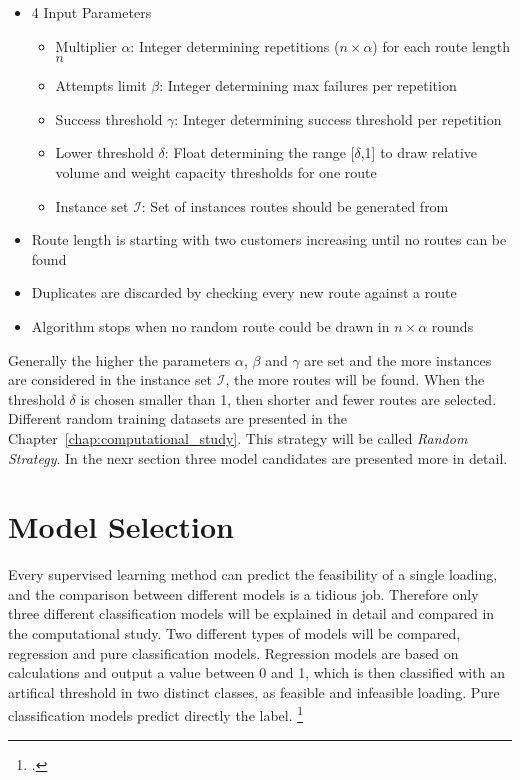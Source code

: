 \begin{itemize}
    \item 4 Input Parameters
          \begin{itemize}
              \item Multiplier $\alpha$: Integer determining repetitions ($n\times\alpha$) for each route length $n$
              \item  Attempts limit $\beta$: Integer determining max failures per repetition
              \item  Success threshold $\gamma$: Integer determining success threshold per repetition
              \item  Lower threshold $\delta$: Float determining the range [$\delta$,1] to draw relative volume and weight capacity thresholds for one route
              \item Instance set $\mathcal{I}$: Set of instances routes should be generated from
          \end{itemize}
    \item Route length is starting with two customers increasing until no routes can be found
    \item Duplicates are discarded by checking every new route against a route
    \item Algorithm stops when no random route could be drawn in $n \times \alpha$ rounds
\end{itemize}

Generally the higher the parameters $\alpha$, $\beta$ and $\gamma$ are set and the more instances
are considered in the instance set $\mathcal{I}$, the more routes will be found. When the threshold $\delta$
is chosen smaller than 1, then shorter and fewer routes are selected. Different
random training datasets are presented in the Chapter~\ref{chap:computational_study}.
This strategy will be called \textit{Random Strategy}. In the nexr section three model candidates
are presented more in detail.

\section{Model Selection}
\label{sec:modelselection}
Every supervised learning method can predict the feasibility of a single loading, and the comparison
between different models is a tidious job. Therefore only three different classification
models will be explained in detail and compared in the computational study.
Two different types of models will be compared, regression and pure classification models. Regression
models are based on calculations and output a value between 0 and 1, which is then classified with
an artifical threshold in two distinct classes, as feasible and infeasible loading. Pure classification
models predict directly the label. \footcite[cf.][p.5]{nasteski_overview_2017}

